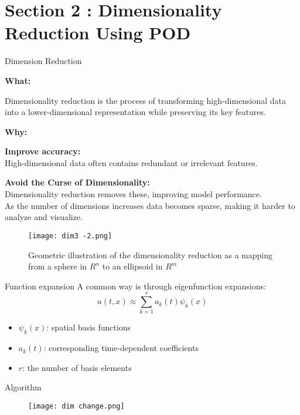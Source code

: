 \documentclass[9pt,xcolor=dvipsnames]{beamer}
\begin{document}
\section{Section 2 : Dimensionality Reduction Using POD}

\begin{frame}{Dimension Reduction}

\textbf{What:}

Dimensionality reduction is the process of transforming high-dimensional data into a lower-dimensional representation while preserving its key features.


\textbf{Why:}

\textbf{Improve accuracy:} \\
High-dimensional data often contains redundant or irrelevant features.

\textbf{Avoid the Curse of Dimensionality:} \\
Dimensionality reduction removes these, improving model performance. \\
As the number of dimensions increases data becomes sparse, making it harder to analyze and visualize.
\begin{figure} 
        \centering
        \texttt{[image: dim3 -2.png]}
        \caption{Geometric illustration of the dimensionality reduction as a mapping from a sphere in $R^n$ to an ellipsoid in $R^m$ \cite{Brunton2022}}
\end{figure}

\end{frame}

\begin{frame}{Function expansion}
A common way is through eigenfunction expansions:
\[
\boxed{u(t,x) \approx \sum_{k=1}^{r} a_k(t) \psi_k(x)}
\]

\begin{itemize}
    \item $\psi_k(x)$: spatial basis functions
    \item $a_k(t)$: corresponding time-dependent coefficients
    \item $r$: the number of basis elements
\end{itemize}
\end{frame}

\begin{frame}{Algorithm}
\begin{figure} 
        \centering
        \texttt{[image: dim change.png]} \hspace{1pt}
\end{figure}
\end{frame}
\end{document}
